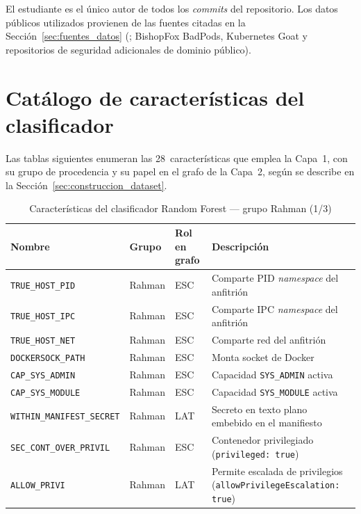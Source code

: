 El estudiante es el único autor de todos los \textit{commits} del repositorio.
Los datos públicos utilizados provienen de las fuentes citadas en la
Sección~\ref{sec:fuentes_datos} (\citealp{Rahman2022}; BishopFox BadPods, Kubernetes Goat y repositorios
de seguridad adicionales de dominio público).

\section{Catálogo de características del clasificador}

Las tablas siguientes enumeran las 28~características que emplea la Capa~1,
con su grupo de procedencia y su papel en el grafo de la Capa~2, según se
describe en la Sección~\ref{sec:construccion_dataset}.

\begin{table}[htbp]
\centering\small
\caption{Características del clasificador Random Forest — grupo Rahman (1/3)}
\label{tab:features_a}
\begin{tabularx}{\textwidth}{@{}Lll>{\hsize}L@{}}
\toprule
Nombre & Grupo & Rol en grafo & Descripción \\
\midrule
\texttt{TRUE\_HOST\_PID} & Rahman & ESC & Comparte PID \textit{namespace} del anfitrión \\
\texttt{TRUE\_HOST\_IPC} & Rahman & ESC & Comparte IPC \textit{namespace} del anfitrión \\
\texttt{TRUE\_HOST\_NET} & Rahman & ESC & Comparte red del anfitrión \\
\texttt{DOCKERSOCK\_PATH} & Rahman & ESC & Monta socket de Docker \\
\texttt{CAP\_SYS\_ADMIN} & Rahman & ESC & Capacidad \texttt{SYS\_ADMIN} activa \\
\texttt{CAP\_SYS\_MODULE} & Rahman & ESC & Capacidad \texttt{SYS\_MODULE} activa \\
\texttt{WITHIN\_MANIFEST\_SECRET} & Rahman & LAT & Secreto en texto plano embebido en el manifiesto \\
\texttt{SEC\_CONT\_OVER\_PRIVIL} & Rahman & ESC & Contenedor privilegiado (\texttt{privileged: true}) \\
\texttt{ALLOW\_PRIVI} & Rahman & LAT & Permite escalada de privilegios (\texttt{allowPrivilege\-Escalation: true}) \\
\bottomrule
\end{tabularx}
\fuentepropia
\end{table}

